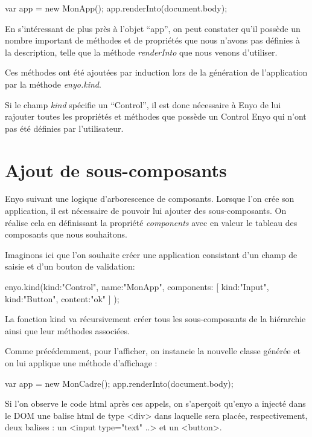\documentclass[11pt,a4paper]{report}
\begin{document}
\begin{JavaScript}
  var app = new MonApp();
  app.renderInto(document.body);
\end{JavaScript}

En s'intéressant de plus près à l'objet ``app'', on peut constater qu'il
possède un nombre important de méthodes et de propriétés que nous n'avons 
pas définies à la description, telle que la méthode \emph{renderInto}
que nous venons d'utiliser.

Ces méthodes ont été ajoutées par induction lors de la génération de 
l'application par la méthode \emph{enyo.kind}.

Si le champ \emph{kind} spécifie un ``Control'', il est donc nécessaire à Enyo de
lui rajouter toutes les propriétés et méthodes que possède un Control Enyo qui
n'ont pas été définies par l'utilisateur.

\section{Ajout de sous-composants}
Enyo suivant une logique d'arborescence de composants. Lorsque l'on crée 
son application, il est nécessaire de pouvoir lui ajouter des sous-composants. 
On réalise cela en définissant la propriété \emph{components} avec en valeur le tableau 
des composants que nous souhaitons.

Imaginons ici que l'on souhaite créer une application consistant d'un champ de saisie 
et d'un bouton de validation:
\begin{JavaScript}
 enyo.kind({kind:"Control",
            name:"MonApp",
            components: [
                         {kind:"Input"},
                         {kind:"Button", content:"ok"}
                        ]
           });
\end{JavaScript}

La fonction kind va récursivement créer tous les sous-composants de la hiérarchie 
ainsi que leur méthodes associées.

Comme précédemment, pour l'afficher, on instancie la nouvelle classe générée 
et on lui applique une méthode d'affichage : 

\begin{JavaScript}
  var app = new MonCadre();
  app.renderInto(document.body);
\end{JavaScript}

Si l'on observe le code html après ces appels, on s'aperçoit qu'enyo a injecté dans 
le DOM une balise html de type <div> dans laquelle sera placée, respectivement, 
deux balises : un <input type="text" ..> et un <button>.
\end{document}
